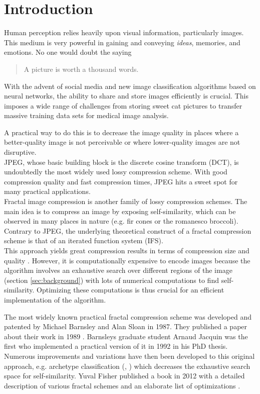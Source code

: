\section{Introduction}\label{sec:intro}
Human perception relies heavily upon visual information, particularly images.
This medium is very powerful in gaining and conveying \textit{ideas}, memories, and emotions.
No one would doubt the saying
\begin{quote}
A picture is worth a thousand words.
\end{quote}
With the advent of social media and new image classification algorithms based on neural
networks, the ability to share and store images efficiently is crucial. This imposes a wide range
of challenges from storing sweet cat pictures to transfer massive training data sets for
medical image analysis.

A practical way to do this is to decrease the image quality in places where a better-quality
image is not perceivable or where lower-quality images are not disruptive. \\
JPEG, whose basic building block is the discrete cosine transform (DCT), is undoubtedly the most widely used lossy compression scheme. 
With good compression quality and fast compression times, JPEG hits a sweet spot for many practical applications.\\
Fractal image compression is another family of lossy compression schemes. The main idea is to compress an image by exposing self-similarity, 
which can be observed in many places in nature (e.g. fir cones or the romanesco broccoli).\\
Contrary to JPEG, the underlying theoretical construct of a fractal compression scheme is that of an iterated function system (IFS).\\
This approach yields great compression results in terms of compression size and quality \cite{fisher2012}. 
However, it is computationally expensive to encode
images because the algorithm involves an exhaustive search over different regions of the image (section \ref{sec:background}) 
with lots of numerical computations to find self-similarity. Optimizing these computations is thus crucial for an efficient implementation of the algorithm.

The most widely known practical fractal compression scheme was developed and patented by Michael Barnsley and Alan Sloan in 1987.
They published a paper about their work in 1989 \cite{barnsley1989fractal}.
Barnsleys graduate student Arnaud Jacquin was the first who implemented a practical version of it in 1992 \cite{jacquin1990fractal} in his PhD thesis.
Numerous improvements and variations have then been developed to this original approach, 
e.g. archetype classification (\cite{jacobs1992image}, \cite{boss1991studies}) which decreases the exhaustive search space for self-similarity. 
Yuval Fisher published a book in 2012 with a detailed description of various fractal schemes and an elaborate list of optimizations \cite{fisher2012}.

